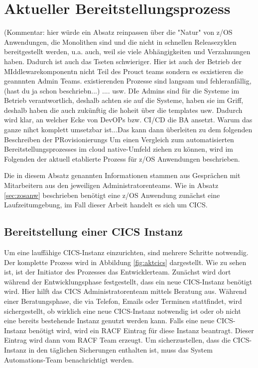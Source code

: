 \section{Aktueller Bereitstellungsprozess}\label{sec:aktbereit}
(Kommentar: hier würde ein Absatz reinpassen über die "Natur" von z/OS Anwendungen, die Monolithen sind und die nicht in schnellen Releasezyklen bereitgestellt werden, u.a. auch, weil sie viele Abhängigkeiten und Verzahnungen haben. Dadurch ist auch das Tseten schwieriger. Hier ist auch der Betrieb der MIddlewarekomponentn nicht Teil des Prouct teams sondern es esxistieren die geannnten Admin Teams.  existierenden Prozesse sind langsam und fehleranfällig, (hast du ja schon beschriebn...) .... usw. DIe Admins sind für die Systeme im Betrieb verantwortlich, deshalb achten sie auf die Systeme, haben sie im Griff, deshalb haben die auch zukünftig die hoheit über die templates usw. Dadurch wird klar, an welcher Ecke von DevOPs bzw. CI/CD die BA ansetzt. Warum das ganze nihct komplett umsetzbar ist...Das kann dann überleiten zu dem folgenden Beschreiben der PRovisionierungs
Um einen Vergleich zum automatisierten Bereitstellungsprozesses im cloud native-Umfeld ziehen zu können, wird im Folgenden der aktuell etablierte Prozess für z/OS Anwendungen beschrieben.

Die in diesem Absatz genannten Informationen stammen aus Gesprächen mit Mitarbeitern aus den jeweiligen Administratorenteams.
Wie in Absatz \ref{sec:zosanw} beschrieben benötigt eine z/OS Anwendung zunächst eine Laufzeitumgebung, im Fall dieser Arbeit handelt es sich um CICS.

\subsection{Bereitstellung einer CICS Instanz}\label{ssec:aktcics}
Um eine lauffähige CICS-Instanz einzurichten, sind mehrere Schritte notwendig.
Der komplette Prozess wird in Abbildung \ref{fig:aktcics} dargestellt.
Wie zu sehen ist, ist der Initiator des Prozesses das Entwicklerteam.
Zunächst wird dort während der Entwicklungsphase festgestellt, dass ein neue CICS-Instanz benötigt wird.
Hier hilft das CICS Administratorenteam mittels Beratung aus.
Während einer Beratungsphase, die via Telefon, Emails oder Terminen stattfindet, wird sichergestellt, ob wirklich eine neue CICS-Instanz notwendig ist oder ob nicht eine bereits bestehende Instanz genutzt werden kann.
Falls eine neue CICS-Instanz benötigt wird, wird ein RACF Eintrag für diese Instanz beantragt.
Dieser Eintrag wird dann vom RACF Team erzeugt.
Um sicherzustellen, dass die CICS-Instanz in den täglichen Sicherungen enthalten ist, muss das System Automations-Team benachrichtigt werden.

